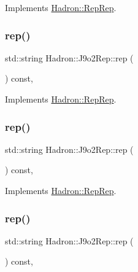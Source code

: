 Implements \mbox{\hyperlink{structHadron_1_1RepRep_ab3213025f6de249f7095892109575fde}{Hadron\+::\+Rep\+Rep}}.

\mbox{\label{structHadron_1_1J9o2Rep_ad83e9b0b6221fcaeeeed5f2653890334}} 
\subsubsection{\texorpdfstring{rep()}{rep()}\hspace{0.1cm}{\footnotesize\ttfamily [2/5]}}
{\footnotesize\ttfamily std\+::string Hadron\+::\+J9o2\+Rep\+::rep (\begin{DoxyParamCaption}{ }\end{DoxyParamCaption}) const\hspace{0.3cm}{\ttfamily [inline]}, {\ttfamily [virtual]}}



Implements \mbox{\hyperlink{structHadron_1_1RepRep_ab3213025f6de249f7095892109575fde}{Hadron\+::\+Rep\+Rep}}.

\mbox{\label{structHadron_1_1J9o2Rep_ad83e9b0b6221fcaeeeed5f2653890334}} 
\subsubsection{\texorpdfstring{rep()}{rep()}\hspace{0.1cm}{\footnotesize\ttfamily [3/5]}}
{\footnotesize\ttfamily std\+::string Hadron\+::\+J9o2\+Rep\+::rep (\begin{DoxyParamCaption}{ }\end{DoxyParamCaption}) const\hspace{0.3cm}{\ttfamily [inline]}, {\ttfamily [virtual]}}



Implements \mbox{\hyperlink{structHadron_1_1RepRep_ab3213025f6de249f7095892109575fde}{Hadron\+::\+Rep\+Rep}}.

\mbox{\label{structHadron_1_1J9o2Rep_ad83e9b0b6221fcaeeeed5f2653890334}} 
\subsubsection{\texorpdfstring{rep()}{rep()}\hspace{0.1cm}{\footnotesize\ttfamily [4/5]}}
{\footnotesize\ttfamily std\+::string Hadron\+::\+J9o2\+Rep\+::rep (\begin{DoxyParamCaption}{ }\end{DoxyParamCaption}) const\hspace{0.3cm}{\ttfamily [inline]}, {\ttfamily [virtual]}}



